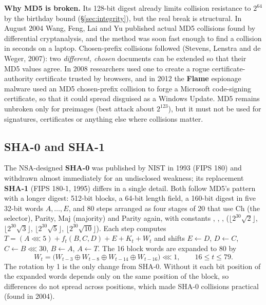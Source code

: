 \textbf{Why MD5 is broken.} Its 128-bit digest already limits collision resistance to $2^{64}$ by the birthday bound (\S\ref{sec:integrity}), but the real break is structural. In August 2004 Wang, Feng, Lai and Yu published actual MD5 collisions found by differential cryptanalysis, and the method was soon fast enough to find a collision in seconds on a laptop. Chosen-prefix collisions followed (Stevens, Lenstra and de Weger, 2007): two \emph{different, chosen} documents can be extended so that their MD5 values agree. In 2008 researchers used one to create a rogue certificate-authority certificate trusted by browsers, and in 2012 the \textbf{Flame} espionage malware used an MD5 chosen-prefix collision to forge a Microsoft code-signing certificate, so that it could spread disguised as a Windows Update. MD5 remains unbroken only for preimages (best attack about $2^{123}$), but it must not be used for signatures, certificates or anything else where collisions matter.

\subsection{SHA-0 and SHA-1 \new}

The NSA-designed \textbf{SHA-0} was published by NIST in 1993 (FIPS 180) and withdrawn almost immediately for an undisclosed weakness; its replacement \textbf{SHA-1} (FIPS 180-1, 1995) differs in a single detail. Both follow MD5's pattern with a longer digest: 512-bit blocks, a 64-bit length field, a 160-bit digest in five 32-bit words $A, \dots, E$, and 80 steps arranged as four stages of 20 that use $\mathrm{Ch}$ (the selector), Parity, $\mathrm{Maj}$ (majority) and Parity again, with constants , , ,  ($\lfloor 2^{30}\sqrt2\rfloor$, $\lfloor 2^{30}\sqrt3\rfloor$, $\lfloor 2^{30}\sqrt5\rfloor$, $\lfloor 2^{30}\sqrt{10}\rfloor$). Each step computes $T = (A \lll 5) + f_t(B, C, D) + E + K_t + W_t$ and shifts $E \leftarrow D$, $D \leftarrow C$, $C \leftarrow B \lll 30$, $B \leftarrow A$, $A \leftarrow T$. The 16 block words are expanded to 80 by
\[
W_t = \big(W_{t-3} \oplus W_{t-8} \oplus W_{t-14} \oplus W_{t-16}\big) \lll 1, \qquad 16 \le t \le 79 .
\]
The rotation by 1 is the only change from SHA-0. Without it each bit position of the expanded words depends only on the same position of the block, so differences do not spread across positions, which made SHA-0 collisions practical (found in 2004).

